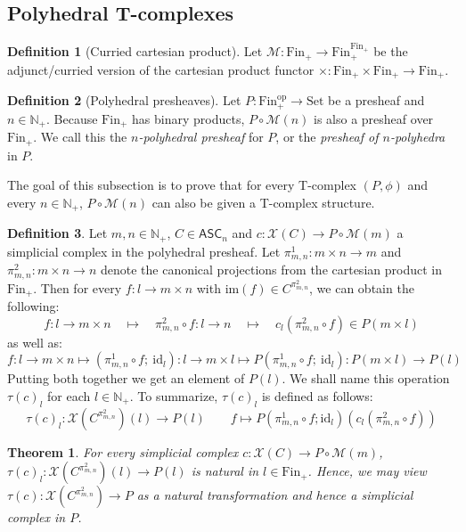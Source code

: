 \documentclass{article}
\newtheorem{theorem}{Theorem}[subsection]
\theoremstyle{remark}
\theoremstyle{definition}
\newtheorem{definition}{Definition}[subsection]
\newcommand{\N}{\mathbb N}
\newcommand{\Fin}{\mathrm{Fin}}
\newcommand{\Set}{\mathrm{Set}}
\newcommand{\op}{\mathrm{op}}
\newcommand{\ASC}{\mathsf{ASC}}
\newcommand{\im}{\mathrm{im}}
\newcommand{\id}{\mathrm{id}}
\newcommand{\X}{\mathcal X}
\newcommand{\M}{\mathcal M}
\begin{document}
	\subsection{Polyhedral T-complexes}
	\begin{definition}[Curried cartesian product]
		Let $\M:\Fin_+\to\Fin_+^{\Fin_+}$ be the adjunct/curried version of the cartesian product functor $\times:\Fin_+\times\Fin_+\to\Fin_+$.
	\end{definition}
	\begin{definition}[Polyhedral presheaves]
		Let $P:\Fin_+^\op\to\Set$ be a presheaf and $n\in\N_+$. Because $\Fin_+$ has binary products, $P\circ\M(n)$ is also a presheaf over $\Fin_+$. We call this the \textit{$n$-polyhedral presheaf} for $P$, or the \textit{presheaf of $n$-polyhedra} in $P$.
	\end{definition}
	The goal of this subsection is to prove that for every T-complex $(P,\phi)$ and every $n\in\N_+$, $P\circ\M(n)$ can also be given a T-complex structure.
	\begin{definition}\label{polyscomp}
		Let $m,n\in\N_+$, $C\in\ASC_n$ and $c:\X(C)\to P\circ\M(m)$ a simplicial complex in the polyhedral presheaf. Let $\pi^1_{m,n}:m\times n\to m$ and $\pi^2_{m,n}:m\times n\to n$ denote the canonical projections from the cartesian product in $\Fin_+$. Then for every $f:l\to m\times n$ with $\im(f)\in C^{\pi^2_{m,n}}$, we can obtain the following:
		\[f:l\to m\times n\quad\longmapsto\quad\pi^2_{m,n}\circ f:l\to n\quad\longmapsto\quad c_l(\pi^2_{m,n}\circ f)\in P(m\times l)\]
		as well as:
		\[f:l\to m\times n\longmapsto(\pi^1_{m,n}\circ f;\ \id_l):l\to m\times l\longmapsto P(\pi^1_{m,n}\circ f;\ \id_l):P(m\times l)\to P(l)\]
		Putting both together we get an element of $P(l)$. We shall name this operation $\tau(c)_l$ for each $l\in\N_+$. To summarize, $\tau(c)_l$ is defined as follows:
		\begin{equation}\label{tau}
			\tau(c)_l:\X(C^{\pi^2_{m,n}})(l)\to P(l)\qquad f\mapsto P(\pi^1_{m,n}\circ f;\id_l)(c_l(\pi^2_{m,n}\circ f))
		\end{equation}
	\end{definition}
	\begin{theorem}
		For every simplicial complex $c:\X(C)\to P\circ\M(m)$, $\tau(c)_l:\X(C^{\pi^2_{m,n}})(l)\to P(l)$ is natural in $l\in\Fin_+$. Hence, we may view $\tau(c):\X(C^{\pi^2_{m,n}})\to P$ as a natural transformation and hence a simplicial complex in $P$.
	\end{theorem}
\end{document}
